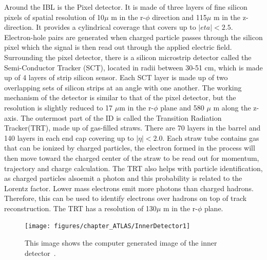 Around the IBL is the Pixel detector. It is made of three layers of fine silicon pixels of spatial resolution of 10$\mu$ m in the r-$\phi$ direction and 115$\mu$ m in the z-direction. It provides a cylindrical coverage that covers up to $|eta|<2.5$. Electron-hole pairs are generated when charged particle passes through the silicon pixel which the signal is then read out through the applied electric field.
Surrounding the pixel detector, there is a silicon microstrip detector called the Semi-Conductor Tracker (SCT), located in radii between 30-51 cm, which is made up of 4 layers of strip silicon sensor. Each SCT layer is made up of two overlapping sets of silicon strips at an angle with one another. The working mechanism of the detector is similar to that of the pixel detector, but the resolution is slightly reduced to 17 $\mu$m in the r-$\phi$ plane and 580 $\mu$ m along the z-axis. 
The outermost part of the ID is called the Transition Radiation Tracker(TRT), made up of gas-filled straws. There are 70 layers in the barrel and 140 layers in each end cap covering up to $|\eta|<2.0$. Each straw tube contains gas that can be ionized by charged particles, the electron formed in the process will then move toward the charged center of the straw to be read out for momentum, trajectory and charge calculation. The TRT also helps with particle identification, as charged particles alsoemit a photon and this probability is related to the Lorentz factor. Lower mass electrons emit more photons than charged hadrons. Therefore, this can be used to identify electrons over hadrons on top of track reconstruction. The TRT has a resolution of 130$\mu$ m in the r-$\phi$ plane.

\begin{figure}[!htb]
    \begin{center}
        \texttt{[image: figures/chapter\_ATLAS/InnerDetector1]}
        \caption{
            This image shows the computer generated image of the inner detector~\cite{Pequenao:1095926}.
        }
        \label{fig:InnerDetector}
    \end{center}
\end{figure}

